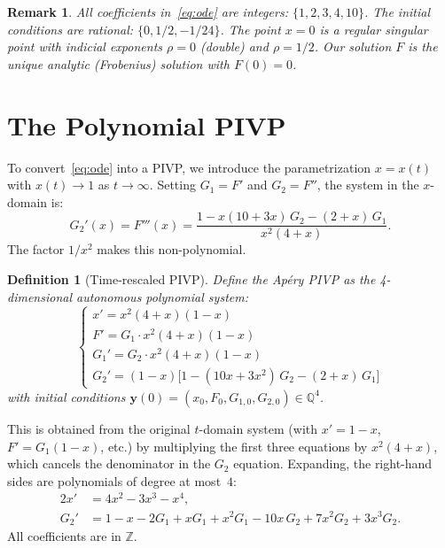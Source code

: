 \documentclass[11pt]{article}
\newtheorem{definition}[theorem]{Definition}
\newtheorem{remark}[theorem]{Remark}
\newcommand{\Q}{\mathbb{Q}}
\newcommand{\Z}{\mathbb{Z}}
\begin{document}
\begin{remark}
All coefficients in~\eqref{eq:ode} are integers: $\{1, 2, 3, 4, 10\}$.
The initial conditions are rational: $\{0, 1/2, -1/24\}$.
The point $x=0$ is a regular singular point with indicial exponents $\rho = 0$ (double) and $\rho = 1/2$.
Our solution $F$ is the unique analytic (Frobenius) solution with $F(0) = 0$.
\end{remark}

\section{The Polynomial PIVP}

To convert~\eqref{eq:ode} into a PIVP, we introduce the parametrization
$x = x(t)$ with $x(t) \to 1$ as $t \to \infty$.
Setting $G_1 = F'$ and $G_2 = F''$, the system in the $x$-domain is:
\begin{equation}\label{eq:xsystem}
  G_2'(x) = F'''(x) = \frac{1 - x(10+3x)\,G_2 - (2+x)\,G_1}{x^2(4+x)}.
\end{equation}
The factor $1/x^2$ makes this non-polynomial.

\begin{definition}[Time-rescaled PIVP]\label{def:pivp}
Define the \emph{Ap\'ery PIVP} as the 4-dimensional autonomous polynomial system:
\begin{equation}\label{eq:pivp-apery}
\begin{cases}
  x' = x^2(4+x)(1-x) \\[3pt]
  F' = G_1 \cdot x^2(4+x)(1-x) \\[3pt]
  G_1' = G_2 \cdot x^2(4+x)(1-x) \\[3pt]
  G_2' = (1-x)\bigl[1 - (10x+3x^2)\,G_2 - (2+x)\,G_1\bigr]
\end{cases}
\end{equation}
with initial conditions
$\mathbf{y}(0) = (x_0, F_0, G_{1,0}, G_{2,0}) \in \Q^4$.
\end{definition}

This is obtained from the original $t$-domain system
(with $x' = 1-x$, $F' = G_1(1-x)$, etc.)
by multiplying the first three equations by $x^2(4+x)$,
which cancels the denominator in the $G_2$ equation.
Expanding, the right-hand sides are polynomials of degree at most~$4$:
\begin{alignat*}{2}
  x' &= 4x^2 - 3x^3 - x^4, \\
  G_2' &= 1 - x - 2G_1 + xG_1 + x^2 G_1 - 10x\,G_2 + 7x^2 G_2 + 3x^3 G_2.
\end{alignat*}
All coefficients are in $\Z$.
\end{document}
